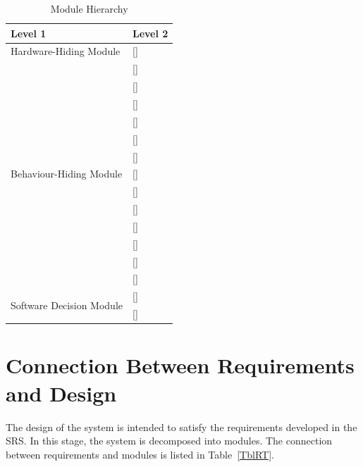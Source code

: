 \documentclass[12pt, titlepage]{article}
\newcommand{\descriptiveid}[1]{{\noexpandarg\StrSubstitute{#1}{_}{\textunderscore\allowbreak}[\idtmp]\texttt{\idtmp}}}
\newcommand{\idref}[1]{\hyperref[#1]{\descriptiveid{#1}}}
\begin{document}
\begin{table}[H]
\centering
\begin{tabular}{p{} p{}}
\toprule
\textbf{Level 1} & \textbf{Level 2}\\
\midrule

{Hardware-Hiding Module} & \idref{M_HardwareHiding} \\
\midrule

\multirow{13}{0.3\textwidth}{Behaviour-Hiding Module} & \idref{M_UserInterface}\\
 & \idref{M_Authentication}\\
 & \idref{M_Authorization}\\
 & \idref{M_CourseManagement}\\
 & \idref{M_Enrollment}\\
 & \idref{M_Projects}\\
 & \idref{M_StudentsTeams}\\
 & \idref{M_Recommendation}\\
 & \idref{M_ApprovalWorkflow}\\
 & \idref{M_Threads}\\
 & \idref{M_Notifications}\\
 & \idref{M_Checklist}\\
 & \idref{M_CourseReport}\\
\midrule

\multirow{2}{0.3\textwidth}{Software Decision Module} & \idref{M_Persistence}\\
 & \idref{M_AuditLog}\\
\bottomrule

\end{tabular}
\caption{Module Hierarchy}
\label{TblMH}
\end{table}

\section{Connection Between Requirements and Design} \label{SecConnection}

The design of the system is intended to satisfy the requirements developed in
the SRS. In this stage, the system is decomposed into modules. The connection
between requirements and modules is listed in Table~\ref{TblRT}.

\end{document}
